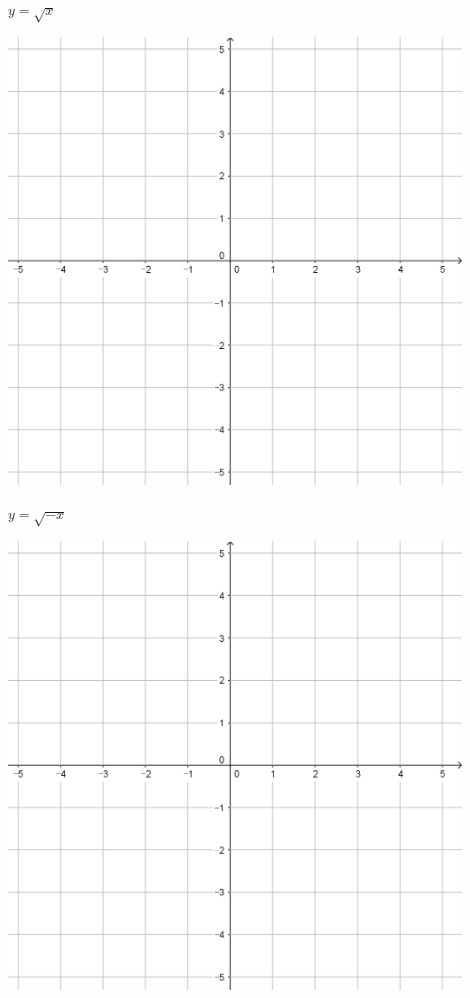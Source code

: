 \documentclass{oblivoir}
\begin{document}
\clearpage
\begin{minipage}{0.45\textwidth}\centering
\(y=\sqrt x\)
\par\bigskip\includegraphics[width=0.9\textwidth]{55}
\end{minipage}
\begin{minipage}{0.45\textwidth}\centering
\(y=\sqrt{-x}\)
\par\bigskip\includegraphics[width=0.9\textwidth]{55}
\end{minipage}\bigskip\bigskip\par
\end{document}
